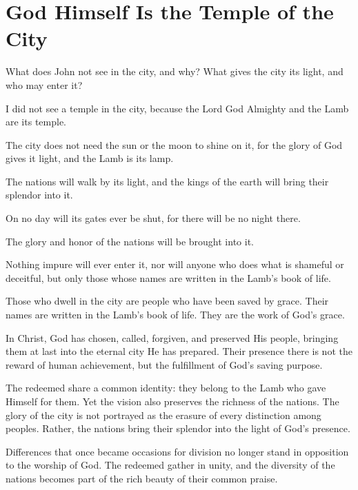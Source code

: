 \section{God Himself Is the Temple of the City}

\begin{ScriptureBox2}{What does John not see in the city, and why? What gives the city its light, and who may enter it?}

\item[21:22] I did not see a temple in the city, because the Lord God Almighty and the Lamb are its temple.

\item[21:23] The city does not need the sun or the moon to shine on it, for the glory of God gives it light, and the Lamb is its lamp.

\item[21:24] The nations will walk by its light, and the kings of the earth will bring their splendor into it.

\item[21:25] On no day will its gates ever be shut, for there will be no night there.

\item[21:26] The glory and honor of the nations will be brought into it.

\item[21:27] Nothing impure will ever enter it, nor will anyone who does what is shameful or deceitful, but only those whose names are written in the Lamb's book of life.

\end{ScriptureBox2}

Those who dwell in the city are people who have been saved by grace. Their names are written in the Lamb's book of life. They are the work of God's grace.

In Christ, God has chosen, called, forgiven, and preserved His people, bringing them at last into the eternal city He has prepared. Their presence there is not the reward of human achievement, but the fulfillment of God's saving purpose.

The redeemed share a common identity: they belong to the Lamb who gave Himself for them. Yet the vision also preserves the richness of the nations. The glory of the city is not portrayed as the erasure of every distinction among peoples. Rather, the nations bring their splendor into the light of God's presence.

Differences that once became occasions for division no longer stand in opposition to the worship of God. The redeemed gather in unity, and the diversity of the nations becomes part of the rich beauty of their common praise.

